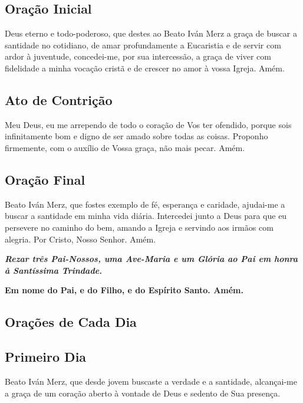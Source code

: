 \documentclass[18pt]{article}
\begin{document}
\subsection*{Oração Inicial}\label{sec:Oração_Inicial}
Deus eterno e todo-poderoso, que destes ao Beato Iván Merz a graça de buscar a santidade no cotidiano, de amar profundamente a Eucaristia e de servir com ardor à juventude, concedei-me, por sua intercessão, a graça de viver com fidelidade a minha vocação cristã e de crescer no amor à vossa Igreja. Amém.

\subsection*{Ato de Contrição}\label{sec:Ato_de_Contrição}
Meu Deus, eu me arrependo de todo o coração de Vos ter ofendido, porque sois infinitamente bom e digno de ser amado sobre todas as coisas. Proponho firmemente, com o auxílio de Vossa graça, não mais pecar. Amém.

\subsection*{Oração Final}\label{sec:Oração_Final}
Beato Iván Merz, que fostes exemplo de fé, esperança e caridade, ajudai-me a buscar a santidade em minha vida diária. Intercedei junto a Deus para que eu persevere no caminho do bem, amando a Igreja e servindo aos irmãos com alegria. Por Cristo, Nosso Senhor. Amém.

\textbf{\textit{Rezar três Pai-Nossos, uma Ave-Maria e um Glória ao Pai em honra à Santíssima Trindade.}}

\textbf{Em nome do Pai, e do Filho, e do Espírito Santo. Amém.}

\vfill


\subsection*{Orações de Cada Dia}

\subsection*{Primeiro Dia}
\textbf{\textit{}}

Beato Iván Merz, que desde jovem buscaste a verdade e a santidade, alcançai-me a graça de um coração aberto à vontade de Deus e sedento de Sua presença.
\end{document}
